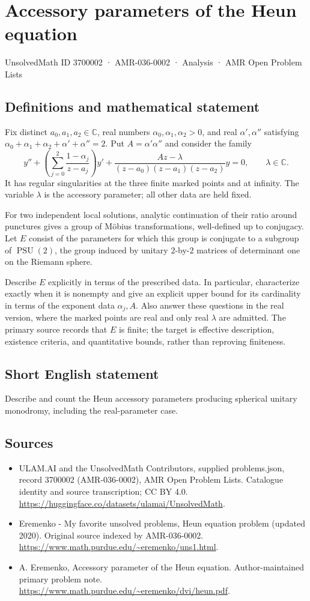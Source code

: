 \documentclass[11pt,a4paper]{article}
\begin{document}
\section*{Accessory parameters of the Heun equation}\label{3700002}
{\small UnsolvedMath ID 3700002 · AMR-036-0002 · Analysis · AMR Open Problem Lists}
\subsection{Definitions and mathematical statement}
Fix distinct $a_0,a_1,a_2\in\mathbb C$, real numbers
$\alpha_0,\alpha_1,\alpha_2>0$, and real $\alpha',\alpha''$
satisfying $\alpha_0+\alpha_1+\alpha_2+\alpha'+\alpha''=2$.
Put $A=\alpha'\alpha''$ and consider the family
\[
 y''+\left(\sum_{j=0}^2\frac{1-\alpha_j}{z-a_j}\right)y'
       +\frac{Az-\lambda}{(z-a_0)(z-a_1)(z-a_2)}y=0,
       \qquad\lambda\in\mathbb C.
\]
It has regular singularities at the three finite marked points
and at infinity. The variable $\lambda$ is the accessory
parameter; all other data are held fixed.

For two independent local solutions, analytic continuation of
their ratio around punctures gives a group of Möbius
transformations, well-defined up to conjugacy. Let $E$ consist
of the parameters for which this group is conjugate to a
subgroup of $\operatorname{PSU}(2)$, the group induced by
unitary $2$-by-$2$ matrices of determinant one on the
Riemann sphere.

Describe $E$ explicitly in terms of the prescribed data.
In particular, characterize exactly when it is nonempty and
give an explicit upper bound for its cardinality in terms of
the exponent data $\alpha_j,A$. Also answer these questions
in the real version, where the marked points are real and
only real $\lambda$ are admitted. The primary source records
that $E$ is finite; the target is effective description,
existence criteria, and quantitative bounds, rather than
reproving finiteness.
\subsection{Short English statement}
Describe and count the Heun accessory parameters producing spherical unitary monodromy, including the real-parameter case.
\subsection{Sources}
\begin{itemize}
\item[S1] ULAM.AI and the UnsolvedMath Contributors, supplied problems.json, record 3700002 (AMR-036-0002), AMR Open Problem Lists. Catalogue identity and source transcription; CC BY 4.0.
\url{https://huggingface.co/datasets/ulamai/UnsolvedMath}.
\item[S2] Eremenko - My favorite unsolved problems, Heun equation problem (updated 2020). Original source indexed by AMR-036-0002.
\url{https://www.math.purdue.edu/~eremenko/uns1.html}.
\item[S3] A. Eremenko, Accessory parameter of the Heun equation. Author-maintained primary problem note.
\url{https://www.math.purdue.edu/~eremenko/dvi/heun.pdf}.
\end{itemize}
\end{document}
